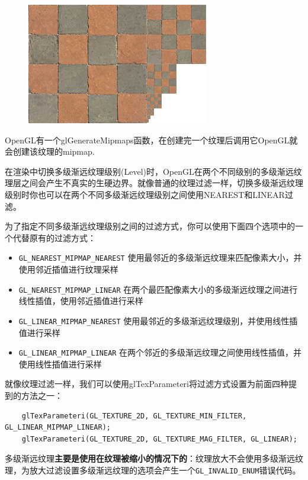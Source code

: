 \documentclass[UTF8,a4paper,12pt]{ctexbook}
\begin{document}
			\begin{figure}[H]
				\centering
				\includegraphics[width=.7\linewidth]{mipmaps}
			\end{figure}
			
			OpenGL有一个glGenerateMipmaps函数，在创建完一个纹理后调用它OpenGL就会创建该纹理的mipmap.
			
			在渲染中切换多级渐远纹理级别(Level)时，OpenGL在两个不同级别的多级渐远纹理层之间会产生不真实的生硬边界。就像普通的纹理过滤一样，切换多级渐远纹理级别时你也可以在两个不同多级渐远纹理级别之间使用NEAREST和LINEAR过滤。
			
			为了指定不同多级渐远纹理级别之间的过滤方式，你可以使用下面四个选项中的一个代替原有的过滤方式：
			\begin{itemize}
				\item \verb|GL_NEAREST_MIPMAP_NEAREST|	使用最邻近的多级渐远纹理来匹配像素大小，并使用邻近插值进行纹理采样
				\item \verb|GL_NEAREST_MIPMAP_LINEAR|	在两个最匹配像素大小的多级渐远纹理之间进行线性插值，使用邻近插值进行采样
				\item \verb|GL_LINEAR_MIPMAP_NEAREST|	使用最邻近的多级渐远纹理级别，并使用线性插值进行采样
				\item \verb|GL_LINEAR_MIPMAP_LINEAR|	在两个邻近的多级渐远纹理之间使用线性插值，并使用线性插值进行采样
			\end{itemize}
			
			就像纹理过滤一样，我们可以使用glTexParameteri将过滤方式设置为前面四种提到的方法之一：
			\begin{lstlisting}
	glTexParameteri(GL_TEXTURE_2D, GL_TEXTURE_MIN_FILTER, GL_LINEAR_MIPMAP_LINEAR);
	glTexParameteri(GL_TEXTURE_2D, GL_TEXTURE_MAG_FILTER, GL_LINEAR);				
			\end{lstlisting}
			
			
			多级渐远纹理\textbf{主要是使用在纹理被缩小的情况下的}：纹理放大不会使用多级渐远纹理，为放大过滤设置多级渐远纹理的选项会产生一个\verb|GL_INVALID_ENUM|错误代码。
			
\end{document}
